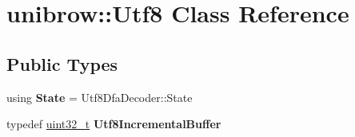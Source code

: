 \hypertarget{classunibrow_1_1Utf8}{}\section{unibrow\+:\+:Utf8 Class Reference}
\label{classunibrow_1_1Utf8}
\subsection*{Public Types}
\begin{DoxyCompactItemize}
\item 
\mbox{\label{classunibrow_1_1Utf8_aee11bc8d46b900656758d6c9f8ae5d53}} 
using {\bfseries State} = Utf8\+Dfa\+Decoder\+::\+State
\item 
\mbox{\label{classunibrow_1_1Utf8_a44ff7c56af391b27a57a6b5630d1c02d}} 
typedef \mbox{\hyperlink{classuint32__t}{uint32\+\_\+t}} {\bfseries Utf8\+Incremental\+Buffer}
\end{DoxyCompactItemize}
